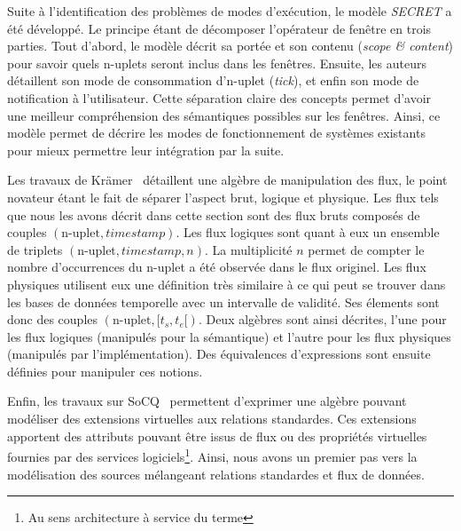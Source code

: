 Suite à l'identification des problèmes de modes d'exécution, le modèle \textit{SECRET} a été développé. Le principe étant de décomposer l'opérateur de fenêtre en trois parties. Tout d'abord, le modèle décrit sa portée et son contenu (\textit{scope \& content}) pour savoir quels n-uplets seront inclus dans les fenêtres. Ensuite, les auteurs détaillent son mode de consommation d'n-uplet (\textit{tick}), et enfin son mode de notification à l'utilisateur. Cette séparation claire des concepts permet d'avoir une meilleur compréhension des sémantiques possibles sur les fenêtres. Ainsi, ce modèle permet de décrire les modes de fonctionnement de systèmes existants pour mieux permettre leur intégration par la suite.

Les travaux de Krämer~\cite{Kramer:semantics} détaillent une algèbre de manipulation des flux, le point novateur étant le fait de séparer l'aspect brut, logique et physique. Les flux tels que nous les avons décrit dans cette section sont des flux bruts composés de couples $(\textrm{n-uplet},\textit{timestamp})$. Les flux logiques sont quant à eux un ensemble de triplets $(\textrm{n-uplet}, \textit{timestamp}, n)$. La multiplicité $n$ permet de compter le nombre d'occurrences du n-uplet a été observée dans le flux originel. Les flux physiques utilisent eux une définition très similaire à ce qui peut se trouver dans les bases de données temporelle avec un intervalle de validité. Ses élements sont donc des couples $(\textrm{n-uplet},[t_s, t_e[)$. Deux algèbres sont ainsi décrites, l'une pour les flux logiques (manipulés pour la sémantique) et l'autre pour les flux physiques (manipulés par l'implémentation). Des équivalences d'expressions sont ensuite définies pour manipuler ces notions.

Enfin, les travaux sur SoCQ~\cite{Gripay:algebra} permettent d'exprimer une algèbre pouvant modéliser des extensions virtuelles aux relations standardes. Ces extensions apportent des attributs pouvant être issus de flux ou des propriétés virtuelles fournies par des services logiciels\footnote{Au sens architecture à service du terme}. Ainsi, nous avons un premier pas vers la modélisation des sources mélangeant relations standardes et flux de données.

